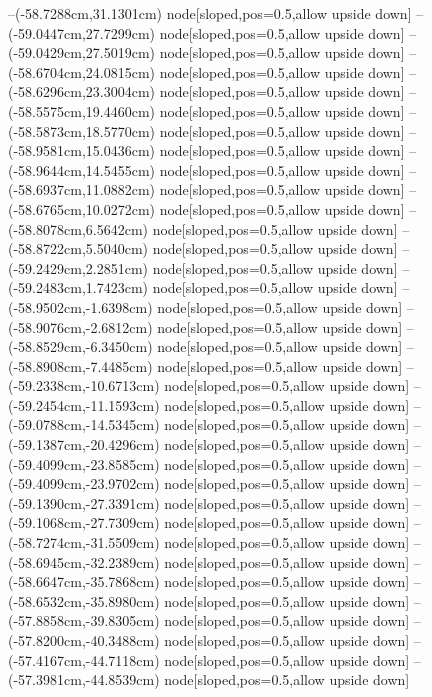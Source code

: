 --(-58.7288cm,31.1301cm) node[sloped,pos=0.5,allow upside down]{\arrowIn}
--(-59.0447cm,27.7299cm) node[sloped,pos=0.5,allow upside down]{\ArrowIn}
--(-59.0429cm,27.5019cm) node[sloped,pos=0.5,allow upside down]{\arrowIn}
--(-58.6704cm,24.0815cm) node[sloped,pos=0.5,allow upside down]{\ArrowIn}
--(-58.6296cm,23.3004cm) node[sloped,pos=0.5,allow upside down]{\arrowIn}
--(-58.5575cm,19.4460cm) node[sloped,pos=0.5,allow upside down]{\ArrowIn}
--(-58.5873cm,18.5770cm) node[sloped,pos=0.5,allow upside down]{\arrowIn}
--(-58.9581cm,15.0436cm) node[sloped,pos=0.5,allow upside down]{\ArrowIn}
--(-58.9644cm,14.5455cm) node[sloped,pos=0.5,allow upside down]{\arrowIn}
--(-58.6937cm,11.0882cm) node[sloped,pos=0.5,allow upside down]{\ArrowIn}
--(-58.6765cm,10.0272cm) node[sloped,pos=0.5,allow upside down]{\ArrowIn}
--(-58.8078cm,6.5642cm) node[sloped,pos=0.5,allow upside down]{\ArrowIn}
--(-58.8722cm,5.5040cm) node[sloped,pos=0.5,allow upside down]{\ArrowIn}
--(-59.2429cm,2.2851cm) node[sloped,pos=0.5,allow upside down]{\ArrowIn}
--(-59.2483cm,1.7423cm) node[sloped,pos=0.5,allow upside down]{\arrowIn}
--(-58.9502cm,-1.6398cm) node[sloped,pos=0.5,allow upside down]{\ArrowIn}
--(-58.9076cm,-2.6812cm) node[sloped,pos=0.5,allow upside down]{\ArrowIn}
--(-58.8529cm,-6.3450cm) node[sloped,pos=0.5,allow upside down]{\ArrowIn}
--(-58.8908cm,-7.4485cm) node[sloped,pos=0.5,allow upside down]{\ArrowIn}
--(-59.2338cm,-10.6713cm) node[sloped,pos=0.5,allow upside down]{\ArrowIn}
--(-59.2454cm,-11.1593cm) node[sloped,pos=0.5,allow upside down]{\arrowIn}
--(-59.0788cm,-14.5345cm) node[sloped,pos=0.5,allow upside down]{\ArrowIn}
--(-59.1387cm,-20.4296cm) node[sloped,pos=0.5,allow upside down]{\ArrowIn}
--(-59.4099cm,-23.8585cm) node[sloped,pos=0.5,allow upside down]{\ArrowIn}
--(-59.4099cm,-23.9702cm) node[sloped,pos=0.5,allow upside down]{\arrowIn}
--(-59.1390cm,-27.3391cm) node[sloped,pos=0.5,allow upside down]{\ArrowIn}
--(-59.1068cm,-27.7309cm) node[sloped,pos=0.5,allow upside down]{\arrowIn}
--(-58.7274cm,-31.5509cm) node[sloped,pos=0.5,allow upside down]{\ArrowIn}
--(-58.6945cm,-32.2389cm) node[sloped,pos=0.5,allow upside down]{\arrowIn}
--(-58.6647cm,-35.7868cm) node[sloped,pos=0.5,allow upside down]{\ArrowIn}
--(-58.6532cm,-35.8980cm) node[sloped,pos=0.5,allow upside down]{\arrowIn}
--(-57.8858cm,-39.8305cm) node[sloped,pos=0.5,allow upside down]{\ArrowIn}
--(-57.8200cm,-40.3488cm) node[sloped,pos=0.5,allow upside down]{\arrowIn}
--(-57.4167cm,-44.7118cm) node[sloped,pos=0.5,allow upside down]{\ArrowIn}
--(-57.3981cm,-44.8539cm) node[sloped,pos=0.5,allow upside down]{\arrowIn}

